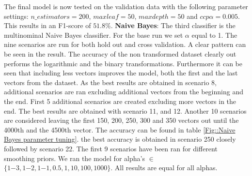\documentclass[11pt]{article}
\begin{document}
%
The final model is now tested on the validation data with the following parameter settings:
$n\_estimators = 200$, $maxleaf = 50$, $maxdepth = 50$ and $ccp \alpha = 0.005$. This results in an F1-score of $51.8\%$.
\newline 
\textbf{Naive Bayes}: The third classifier is the multinominal Naive Bayes classifier. For the base run we set $\alpha$ equal to 1. The nine scenarios are run for both hold out and cross validation. A clear pattern can be seen in the result. The accuracy of the non transformed dataset clearly out performs the logarithmic and the binary transformations. Furthermore it can be seen that including less vectors improves the model, both the first and the last vectors from the dataset. As the best results are obtained in scenario 8, additional scenarios are ran excluding additional vectors from the beginning and the end.  
\newline
First 5 additional scenarios are created excluding more vectors in the end. The best results are obtained with scenario 11, and 12. Another 10 scenarios are considered leaving the first 150, 200, 250, 300 and 350 vectors out until the 4000th and the 4500th vector. The accuracy can be found in table \ref{Fig::Naive Bayes parameter tuning}. the best accuracy is obtained in scenario 250 closely followed by scenario 22.
\newline
The first 9 scenarios have been ran for different smoothing priors. We ran the model for alpha's $\in$ $ \{1{-3}, 1{-2}, 1{-1}, 0.5, 1, 10, 100, 1000\}$. All results are equal for all alphas.  
\end{document}
